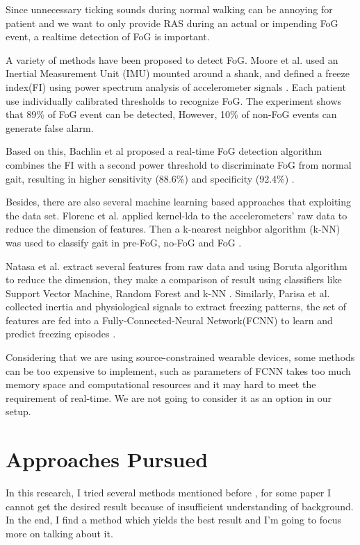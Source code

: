 \documentclass[article]{article}
\begin{document}
 	Since unnecessary ticking sounds during normal walking can be annoying for patient and we want to only provide RAS during an actual or impending FoG event, a realtime detection of FoG is important.
 	
 	  
 	A variety of methods have been proposed to detect FoG. Moore et al. used an Inertial Measurement Unit (IMU) mounted around a shank, and defined a freeze index(FI) using power spectrum analysis of accelerometer signals \cite{FI}. Each patient use individually calibrated thresholds to recognize FoG. The experiment shows that 89\% of FoG event can be detected, However, 10\% of non-FoG events can generate false alarm. 
 	
 	Based on this, Bachlin et al proposed a real-time FoG detection algorithm combines the FI with a second power threshold to discriminate FoG from normal gait, resulting in higher sensitivity (88.6\%) and specificity (92.4\%) \cite{FI1}.
   
    Besides, there are also several machine learning based approaches that exploiting the data set. Florenc et al. applied kernel-lda to the accelerometers' raw data to reduce the dimension of features. Then a k-nearest neighbor algorithm (k-NN) was used to classify gait in pre-FoG, no-FoG and FoG \cite{Flo}. 
    
    Natasa et al. extract several features from raw data and using Boruta algorithm to reduce the dimension, they make a comparison of result using classifiers like Support Vector Machine, Random Forest and k-NN \cite{ML}.
    Similarly, Parisa et al. collected  inertia and physiological signals to extract freezing patterns, the set of features are fed into a Fully-Connected-Neural Network(FCNN) to learn and predict freezing episodes \cite{symptoms}.
    
    Considering that we are using source-constrained wearable devices, some methods can be too expensive to implement, such as parameters of FCNN takes too much memory space and computational resources and it may hard to meet the requirement of real-time. We are not going to consider it as an option in our setup.

 
    
\section{Approaches Pursued}

	In this research, I tried several methods mentioned before \cite{FI1} \cite{Flo} \cite{ML}, for some paper I cannot get the desired result because of insufficient understanding of background. In the end, I find a method which yields the best result and I'm going to focus more on talking about it.
	
\end{document}
